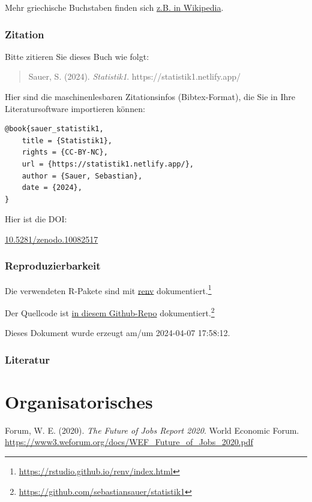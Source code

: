 \documentclass[
  a4paper,
  DIV=11]{scrreprt}
\newlength{\cslhangindent}
\newenvironment{CSLReferences}[2] %
 {\begin{list}{}{%
  \setlength{\itemindent}{0pt}
  \setlength{\leftmargin}{0pt}
  \setlength{\parsep}{0pt}
  \ifodd #1
   \setlength{\leftmargin}{\cslhangindent}
   \setlength{\itemindent}{-1\cslhangindent}
  \fi
  \setlength{\itemsep}{#2\baselineskip}}}
 {\end{list}}
\begin{document}
Mehr griechische Buchstaben finden sich
\href{https://de.wikipedia.org/wiki/Griechisches_Alphabet}{z.B. in
Wikipedia}.

\section{Zitation}\label{zitation}

Bitte zitieren Sie dieses Buch wie folgt:

\begin{quote}
Sauer, S. (2024). \emph{Statistik1}. https://statistik1.netlify.app/
\end{quote}

Hier sind die maschinenlesbaren Zitationsinfos (Bibtex-Format), die Sie
in Ihre Literatursoftware importieren können:

\begin{verbatim}
@book{sauer_statistik1,
    title = {Statistik1},
    rights = {CC-BY-NC},
    url = {https://statistik1.netlify.app/},
    author = {Sauer, Sebastian},
    date = {2024},
}
\end{verbatim}

Hier ist die DOI:

\href{https://zenodo.org/doi/10.5281/zenodo.10082517}{10.5281/zenodo.10082517}

\section{Reproduzierbarkeit}\label{reproduzierbarkeit}

Die verwendeten R-Pakete sind mit
\href{https://rstudio.github.io/renv/index.html}{renv}
dokumentiert.\footnote{\url{https://rstudio.github.io/renv/index.html}}

Der Quellcode ist \href{https://github.com/sebastiansauer/statistik1}{in
diesem Github-Repo} dokumentiert.\footnote{\url{https://github.com/sebastiansauer/statistik1}}

Dieses Dokument wurde erzeugt am/um 2024-04-07 17:58:12.

\section{Literatur}\label{literatur}

\part{Organisatorisches}

\label{refs}
\begin{CSLReferences}{1}{0}
Forum, W. E. (2020). \emph{The {Future} of {Jobs Report} 2020}. World
Economic Forum.
\url{https://www3.weforum.org/docs/WEF_Future_of_Jobs_2020.pdf}

\end{CSLReferences}
\end{document}
